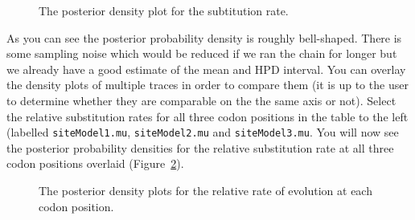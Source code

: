 \documentclass[cup7b, english]{cupbook}
\begin{document}
\begin{figure}[htbp]
\begin{center}
\leavevmode
{}
\end{center}
\caption{The posterior density plot for the subtitution rate.}
\label{fig:figure8}
\end{figure}

As you can see the posterior probability density is roughly bell-shaped.
There is some sampling noise which would be reduced if we ran the chain for longer but
we already have a good estimate of the mean and HPD interval. You can overlay
the density plots of multiple traces in order to compare them (it is up to the user to determine
whether they are comparable on the the same axis or not). Select the relative substitution rates for all three
codon positions in the table to the left (labelled \texttt{siteModel1.mu}, \texttt{siteModel2.mu} and \texttt{siteModel3.mu}. You will now see
the posterior probability densities for the relative substitution rate at all three codon positions
overlaid (Figure~\ref{fig:figure9}).

\begin{figure}[htbp]
\begin{center}
\leavevmode
{}
\end{center}
\caption{The posterior density plots for the relative rate of evolution at each
codon position.}
\label{fig:figure9}
\end{figure}
\end{document}

